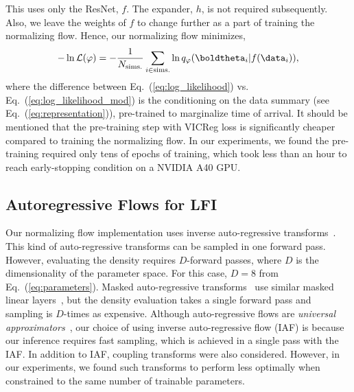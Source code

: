 \begin{refsection}
This uses only the ResNet, $f$. 
The expander, $h$, is not required subsequently. 
Also, we leave the weights of $f$ to change further as a part of training the normalizing flow. 
Hence, our normalizing flow minimizes,
\begin{equation}
    - \ln \mathcal{L}(\varphi) = - \frac{1}{N_{\mathrm{sims.}}}\sum_{i \in \mathrm{sims.}} \ln q_{\varphi}(\boldtheta_i \vert f(\data_i)),
    \label{eq:log_likelihood_mod}
\end{equation}
where the difference between Eq.~(\ref{eq:log_likelihood}) vs. Eq.~(\ref{eq:log_likelihood_mod}) is the conditioning on the data summary (see Eq.~(\ref{eq:representation})), pre-trained to marginalize time of arrival. 
It should be mentioned that the pre-training step with VICReg loss is significantly cheaper compared to training the normalizing flow. 
In our experiments, we found the pre-training required only tens of epochs of training, which took less than an hour to reach early-stopping condition on a NVIDIA A40 GPU.

\subsection{\label{amp_meth_sec:normalizing-flow}Autoregressive Flows for LFI}
Our normalizing flow implementation uses inverse auto-regressive transforms~\cite{kingma2017improving}.
This kind of auto-regressive transforms can be sampled in one forward pass. 
However, evaluating the density requires $D$-forward passes, where $D$ is the dimensionality of the parameter space.
For this case, $D=8$ from Eq.~(\ref{eq:parameters}). 
Masked auto-regressive transforms~\cite{papamakarios2018masked} use similar masked linear layers~\cite{pmlr-v37-germain15}, but the density evaluation takes a single forward pass and sampling is $D$-times as expensive. 
Although auto-regressive flows are \emph{universal approximators}~\cite{papamakarios2021normalizing}, our choice of using inverse auto-regressive flow (IAF) is because our inference requires fast sampling, which is achieved in a single pass with the IAF. 
In addition to IAF, coupling transforms were also considered. 
However, in our experiments, we found such transforms to perform less optimally when constrained to the same number of trainable parameters.


\end{refsection}
